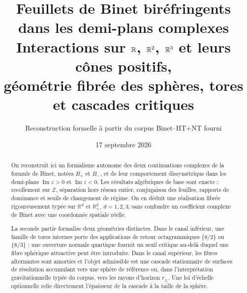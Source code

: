 \documentclass[11pt,a4paper]{article}
\title{\textbf{Feuillets de Binet biréfringents dans les demi-plans complexes}\\[0.35em]
\large Interactions sur $\R$, $\R^2$, $\R^3$ et leurs cônes positifs,\\
géométrie fibrée des sphères, tores et cascades critiques}
\author{Reconstruction formelle à partir du corpus Binet--HT+NT fourni}
\date{17 septembre 2026}
\newcommand{\R}{\mathbb R}
\newcommand{\Z}{\mathbb Z}
\newcommand{\Rp}{\mathbb R_{+}}
\newcommand{\Ima}{\operatorname{Im}}
\begin{document}
\maketitle

\begin{abstract}
On reconstruit ici un formalisme autonome des deux continuations complexes de la formule de Binet, notées $B_+$ et $B_-$, et de leur comportement dissymétrique dans les demi-plans $\Ima z>0$ et $\Ima z<0$. Les résultats algébriques de base sont exacts : recollement sur $\Z$, séparation hors réseau entier, conjugaison des feuilles, rapports de dominance et seuils de changement de régime. On en déduit une réalisation fibrée rigoureusement typée sur $\R^d$ et $\Rp^d$, $d=1,2,3$, sans confondre un coefficient complexe de Binet avec une coordonnée spatiale réelle.

La seconde partie formalise deux géométries distinctes. Dans le canal inférieur, une famille de tores internes porte des applications de retour octagrammiques $\{8/2\}$ ou $\{8/3\}$ ; une ouverture normale quartique fournit un seuil critique au-delà duquel une fibre sphérique attractive peut être introduite. Dans le canal supérieur, les fibres alternantes sont amorties et l'objet admissible est une cascade stationnaire de surfaces de résolution accumulant vers une sphère de référence ou, dans l'interprétation gravitationnelle typée du corpus, vers les rayons d'horizon $r_\pm$. Une loi d'échelle optionnelle relie directement l'épaisseur de la cascade à la taille de la sphère.


\end{abstract}
\end{document}
